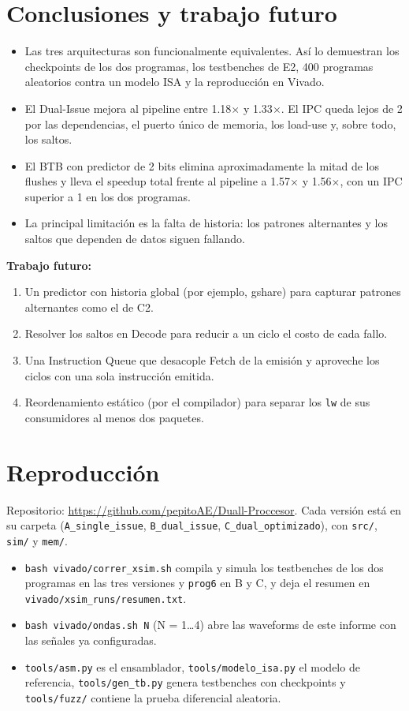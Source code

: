 \documentclass[11pt,a4paper]{article}
\newcommand{\sig}[1]{\texttt{#1}}
\begin{document}
\section{Conclusiones y trabajo futuro}

\begin{itemize}
  \item Las tres arquitecturas son funcionalmente equivalentes. Así lo demuestran los checkpoints de los dos programas, los testbenches de E2, 400 programas aleatorios contra un modelo ISA y la reproducción en Vivado.
  \item El Dual-Issue mejora al pipeline entre 1.18$\times$ y 1.33$\times$. El IPC queda lejos de 2 por las dependencias, el puerto único de memoria, los load-use y, sobre todo, los saltos.
  \item El BTB con predictor de 2 bits elimina aproximadamente la mitad de los flushes y lleva el speedup total frente al pipeline a 1.57$\times$ y 1.56$\times$, con un IPC superior a 1 en los dos programas.
  \item La principal limitación es la falta de historia: los patrones alternantes y los saltos que dependen de datos siguen fallando.
\end{itemize}

\textbf{Trabajo futuro:}
\begin{enumerate}[nosep]
  \item Un predictor con historia global (por ejemplo, gshare) para capturar patrones alternantes como el de C2.
  \item Resolver los saltos en Decode para reducir a un ciclo el costo de cada fallo.
  \item Una Instruction Queue que desacople Fetch de la emisión y aproveche los ciclos con una sola instrucción emitida.
  \item Reordenamiento estático (por el compilador) para separar los \sig{lw} de sus consumidores al menos dos paquetes.
\end{enumerate}

\appendix
\sloppy
\section{Reproducción}

Repositorio: \url{https://github.com/pepitoAE/Duall-Proccesor}. Cada versión está en su carpeta (\sig{A\_single\_issue}, \sig{B\_dual\_issue}, \sig{C\_dual\_optimizado}), con \sig{src/}, \sig{sim/} y \sig{mem/}.

\begin{itemize}[nosep]
  \item \sig{bash vivado/correr\_xsim.sh} compila y simula los testbenches de los dos programas en las tres versiones y \sig{prog6} en B y C, y deja el resumen en \sig{vivado/xsim\_runs/resumen.txt}.
  \item \sig{bash vivado/ondas.sh N} (N = 1…4) abre las waveforms de este informe con las señales ya configuradas.
  \item \sig{tools/asm.py} es el ensamblador, \sig{tools/modelo\_isa.py} el modelo de referencia, \sig{tools/gen\_tb.py} genera testbenches con checkpoints y \sig{tools/fuzz/} contiene la prueba diferencial aleatoria.
\end{itemize}
\end{document}
